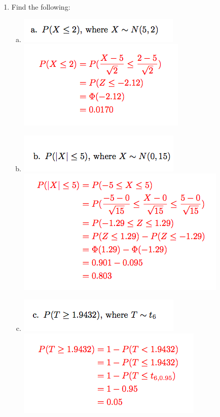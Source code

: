 \documentclass{article}\usepackage{graphicx, color}
\numberwithin{equation}{section}
\begin{document}
\begin{flushleft}
\begin{enumerate}[1. ]
\item Find the following:
\begin{enumerate}[a. ]
\item 
{} \includegraphics{../../fig/h6p4a.png}
 \includegraphics{../../fig/h6p4asol.png}

\item 
{} \includegraphics{../../fig/h6p4b.png}
 \includegraphics{../../fig/h6p4bsol.png}

\item 
{} \includegraphics{../../fig/h6p4c.png}
 \includegraphics{../../fig/h6p4csol.png}


\end{enumerate}
\end{enumerate}
\end{flushleft}
\end{document}
